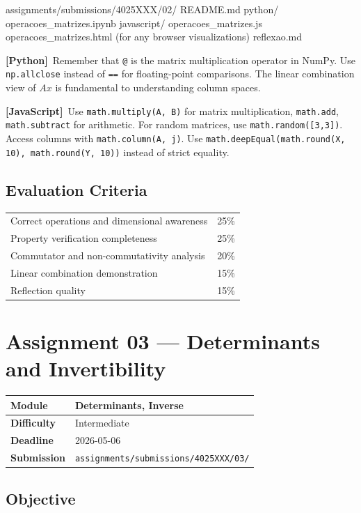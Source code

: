\documentclass[a4paper,11pt]{article}
\newcommand{\assignmentmeta}[4]{%
  \noindent
  \begin{tabularx}{\textwidth}{
    >{\bfseries\color{ippblue}\cellcolor{lightblue}}p{3cm}
    X}
    \arrayrulecolor{gray!40}\hline
    Module     & #1 \\ \hline
    Difficulty & #2 \\ \hline
    Deadline   & #3 \\ \hline
    Submission & \texttt{assignments/submissions/4025XXX/#4/} \\ \hline
  \end{tabularx}
  \vspace{0.8em}
}
\newcommand{\pylabel}{\textcolor{pyborder}{\textbf{[Python]}}}
\newcommand{\jslabel}{\textcolor{jsborder}{\textbf{[JavaScript]}}}
\begin{document}
\begin{code}
assignments/submissions/4025XXX/02/
  README.md
  python/
    operacoes_matrizes.ipynb
  javascript/
    operacoes_matrizes.js
    operacoes_matrizes.html     (for any browser visualizations)
  reflexao.md
\end{code}

\begin{hintbox}
  \pylabel\ Remember that \texttt{@} is the matrix multiplication operator in NumPy. Use \texttt{np.allclose} instead of \texttt{==} for floating-point comparisons. The linear combination view of $Ax$ is fundamental to understanding column spaces.

  \medskip

  \jslabel\ Use \texttt{math.multiply(A, B)} for matrix multiplication, \texttt{math.add}, \texttt{math.subtract} for arithmetic. For random matrices, use \texttt{math.random([3,3])}. Access columns with \texttt{math.column(A, j)}. Use \texttt{math.deepEqual(math.round(X, 10), math.round(Y, 10))} instead of strict equality.
\end{hintbox}

\subsection{Evaluation Criteria}

\begin{tabularx}{\textwidth}{X r}
  Correct operations and dimensional awareness & 25\% \\
  Property verification completeness & 25\% \\
  Commutator and non-commutativity analysis & 20\% \\
  Linear combination demonstration & 15\% \\
  Reflection quality & 15\% \\
\end{tabularx}

\newpage

\section{Assignment 03 --- Determinants and Invertibility}

\assignmentmeta{Determinants, Inverse}{Intermediate}{2026-05-06}{03}

\subsection{Objective}
\end{document}
